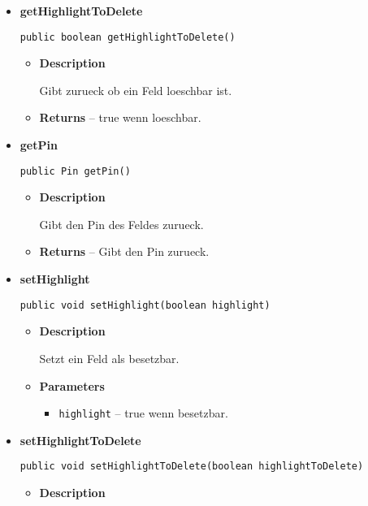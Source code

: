\documentclass[11pt,a4paper]{report}
\begin{document}
{{{{{{{{\begin{itemize}
{\begin{itemize}
{Gibt zurueck ob ein Feld besetzbar ist.
}
\item{{\bf  Returns} -- 
true wenn besetzbar. 
}%
\end{itemize}
}%
\item{ 
{\bf  getHighlightToDelete}\\
\begin{lstlisting}[frame=none]
public boolean getHighlightToDelete()\end{lstlisting} %
\begin{itemize}
\item{
{\bf  Description}

Gibt zurueck ob ein Feld loeschbar ist.
}
\item{{\bf  Returns} -- 
true wenn loeschbar. 
}%
\end{itemize}
}%
\item{ 
{\bf  getPin}\\
\begin{lstlisting}[frame=none]
public Pin getPin()\end{lstlisting} %
\begin{itemize}
\item{
{\bf  Description}

Gibt den Pin des Feldes zurueck.
}
\item{{\bf  Returns} -- 
Gibt den Pin zurueck. 
}%
\end{itemize}
}%
\item{ 
{\bf  setHighlight}\\
\begin{lstlisting}[frame=none]
public void setHighlight(boolean highlight)\end{lstlisting} %
\begin{itemize}
\item{
{\bf  Description}

Setzt ein Feld als besetzbar.
}
\item{
{\bf  Parameters}
  \begin{itemize}
   \item{
\texttt{highlight} -- true wenn besetzbar.}
  \end{itemize}
}%
\end{itemize}
}%
\item{ 
{\bf  setHighlightToDelete}\\
\begin{lstlisting}[frame=none]
public void setHighlightToDelete(boolean highlightToDelete)\end{lstlisting} %
\begin{itemize}
\item{
{\bf  Description}

}
\end{itemize}}
\end{itemize}}}}}}}}}
\end{document}

